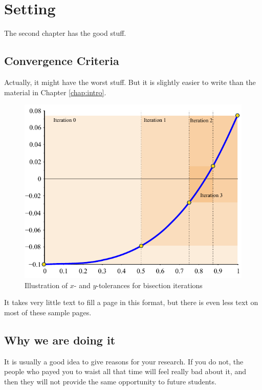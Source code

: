 \documentclass[thesis]{./tex/thesis-umich}
\begin{document}
\chapter{Setting}
The second chapter has the good stuff.

\section{Convergence Criteria}
Actually, it might have the worst stuff.  But it is slightly easier to write than the material in Chapter \ref{chap:intro}.

\begin{figure}
 \begin{center}
  \includegraphics[scale=1]{./pics/f1_tol.pdf}
 \end{center}
 \caption{ \label{fig:fn:tol}
  Illustration of $x$- and $y$-tolerances for bisection iterations}
\end{figure}

\newpage

It takes very little text to fill a page in this format, but there is even less text on most of these sample pages.

\section{Why we are doing it}
It is usually a good idea to give reasons for your research.  If you do not, the people who payed you to waist all that time will feel really bad about it, and then they will not provide the same opportunity to future students.
\end{document}
